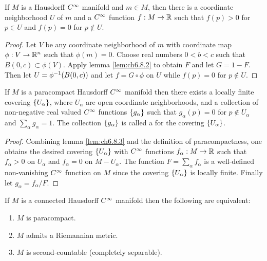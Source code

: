\documentclass[../main]{subfiles}
\begin{document}
\begin{lemma} \label{lem:ch6.8.3}
If $M$ is a Hausdorff $C^\infty$ manifold and $m\in M$, then there is a coordinate neighborhood $U$ of $m$ and a $C^\infty$ function $f:M\to\mathbb{R}$ such that $f(p)>0$ for $p\in U$ and $f(p)=0$ for $p\notin U$.
\end{lemma}

\begin{proof}
Let $V$ be any coordinate neighborhood of $m$ with coordinate map \newline $\phi:V\to\mathbb{R}^n$ such that $\phi(m)=0$. Choose real numbers $0<b<c$ such that $B(0,c)\subset\phi(V)$. Apply lemma \ref{lem:ch6.8.2} to obtain $F$ and let $G=1-F$. Then let $U=\phi^{-1}(B(0,c))$ and let $f=G\circ\phi$ on $U$ while $f(p)=0$ for $p\notin U$.
\end{proof}



\begin{lemma} \label{lem:ch6.8.4}
If $M$ is a paracompact Hausdorff $C^\infty$ manifold then there exists a locally finite covering $\left\{U_\alpha\right\}$, where $U_\alpha$ are open coordinate neighborhoods, and a collection of non-negative real valued $C^\infty$ functions $\left\{g_\alpha\right\}$ such that $g_\alpha(p)=0$ for $p\notin U_\alpha$ and $\sum_\alpha g_\alpha=1$. The collection $\left\{g_\alpha\right\}$ is called a  for the covering $\left\{U_\alpha\right\}$.
\end{lemma}

\begin{proof}
Combining lemma \ref{lem:ch6.8.3} and the definition of paracompactness, one obtains the desired covering $\left\{U_\alpha\right\}$ with $C^\infty$ functions $f_\alpha:M\to\mathbb{R}$ such that $f_\alpha>0$ on $U_\alpha$ and $f_\alpha=0$ on $M-U_\alpha$. The function $F=\sum_\alpha f_\alpha$ is a well-defined non-vanishing $C^\infty$ function on $M$ since the covering $\left\{U_\alpha\right\}$ is locally finite. Finally let $g_\alpha=f_\alpha/F$.
\end{proof}



\begin{theorem} \label{thm:ch6.8.5}
If $M$ is a connected Hausdorff $C^\infty$ manifold then the following are equivalent:
\begin{enumerate}[label=(\alph*)]
    \item $M$ is paracompact.
    \item $M$ admits a Riemannian metric.
    \item $M$ is second-countable (completely separable).
\end{enumerate}
\end{theorem}
\end{document}
